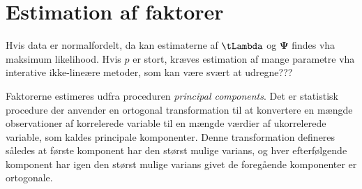 \section{Estimation af faktorer}
Hvis data er normalfordelt, da kan estimaterne af \(\tLambda\) og \(\boldsymbol{\Psi}\) findes vha maksimum likelihood.
Hvis \(p\) er stort, kræves estimation af mange parametre vha interative ikke-lineære metoder, som kan være svært at udregne???

Faktorerne estimeres udfra proceduren \textit{principal components}.
Det er statistisk procedure der anvender en ortogonal transformation til at konvertere en mængde observationer af korrelerede variable til en mængde værdier af ukorrelerede variable, som kaldes principale komponenter.
Denne transformation defineres således at første komponent har den størst mulige varians, og hver efterfølgende komponent har igen den størst mulige varians givet de foregående komponenter er ortogonale.

